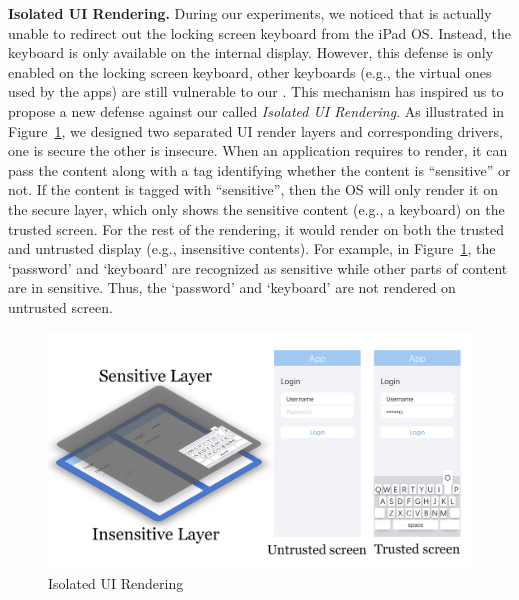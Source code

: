 \textbf{Isolated UI Rendering.} During our experiments, we noticed that \tool
is actually unable to redirect out the locking screen keyboard from the iPad
OS. Instead, the keyboard is only available on the internal display. However,
this defense is only enabled on the locking screen keyboard, other keyboards
(e.g., the virtual ones used by the apps) are still vulnerable to our \tool.
This mechanism has inspired us to propose a new defense against our \tool
called \emph{Isolated UI Rendering}. As illustrated in
Figure~\ref{fig:isolated_ui}, we designed two separated UI render layers and corresponding drivers, one
is secure the other is insecure. When an application requires to render, it can
pass the content along with a tag identifying whether the content is
``sensitive'' or not. If the content is tagged with ``sensitive'', then the OS
will only render it on the secure layer, which only shows the sensitive content
(e.g., a keyboard) on the trusted screen. For the rest of the rendering, it
would render on both the trusted and untrusted display (e.g., insensitive
contents).
For example, in Figure~\ref{fig:isolated_ui}, the `password' and `keyboard' are recognized as sensitive while other parts of content are in sensitive. Thus, the `password' and `keyboard' are not rendered on untrusted screen.

\begin{figure}[t]
	\centering
	\includegraphics[width=\linewidth]{./Figs/isolated_ui.png}
	\caption{Isolated UI Rendering}%
	\label{fig:isolated_ui}
\end{figure}
